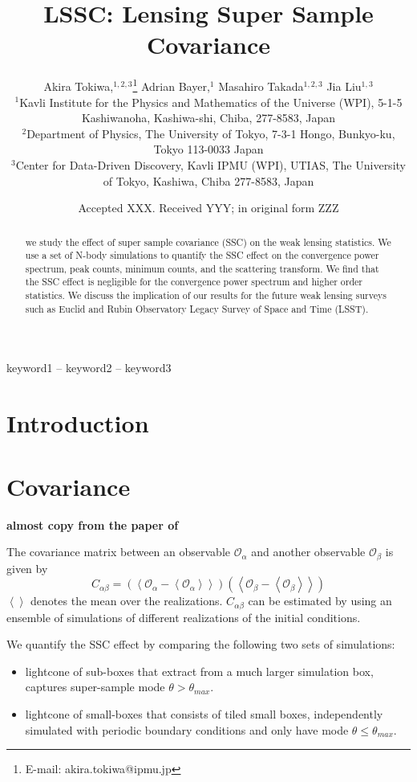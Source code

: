 \documentclass[fleqn,usenatbib]{mnras}
\title[Lensing Super Sample Covariance]{LSSC: Lensing Super Sample Covariance}
\author[A. Tokiwa et al.]{
Akira Tokiwa,$^{1, 2, 3}$\thanks{E-mail: akira.tokiwa@ipmu.jp}
Adrian Bayer,$^{1}$
Masahiro Takada$^{1, 2,3}$
Jia Liu$^{1, 3}$
\\
$^{1}$Kavli Institute for the Physics and Mathematics of the Universe (WPI), 5-1-5 Kashiwanoha, Kashiwa-shi, Chiba, 277-8583, Japan\\
$^{2}$Department of Physics, The University of Tokyo, 7-3-1 Hongo, Bunkyo-ku, Tokyo 113-0033 Japan\\
$^{3}$Center for Data-Driven Discovery, Kavli IPMU (WPI), UTIAS, The University of Tokyo, Kashiwa, Chiba 277-8583, Japan
}
\date{Accepted XXX. Received YYY; in original form ZZZ}
\begin{document}
\label{firstpage}
\pagerange{\pageref{firstpage}--\pageref{lastpage}}
\maketitle

\begin{abstract}
we study the effect of super sample covariance (SSC) on the weak lensing statistics. 
We use a set of N-body simulations to quantify the SSC effect on the convergence power spectrum, peak counts, minimum counts, and the scattering transform. 
We find that the SSC effect is negligible for the convergence power spectrum and higher order statistics.
We discuss the implication of our results for the future weak lensing surveys such as Euclid and Rubin Observatory Legacy Survey of Space and Time (LSST).
\end{abstract}

\begin{keywords}
keyword1 -- keyword2 -- keyword3
\end{keywords}



\section{Introduction}

\section{Covariance}
\textbf{almost copy from the paper of \cite{PhysRevD.108.043521}}

The covariance matrix between an observable $\mathcal{O}_\alpha$ and another observable $\mathcal{O}_\beta$ is given by 
\begin{equation}
    C_{\alpha\beta} = \left(\left<\mathcal{O}_\alpha - \left<\mathcal{O}_\alpha\right>\right>\right)\left(\left<\mathcal{O}_\beta - \left<\mathcal{O}_\beta\right>\right>\right)
\end{equation}
$\left<\right>$ denotes the mean over the realizations. $C_{\alpha\beta}$ can be estimated by using an ensemble of simulations of different realizations of the initial conditions.

We quantify the SSC effect by comparing the following two sets of simulations:
\begin{itemize}
    \item lightcone of sub-boxes that extract from a much larger simulation box, captures super-sample mode $\theta > \theta_{max}$.
    \item lightcone of small-boxes that consists of tiled small boxes, independently simulated with periodic boundary conditions and only have mode $\theta \leq \theta_{max}$.
\end{itemize}
\end{document}
